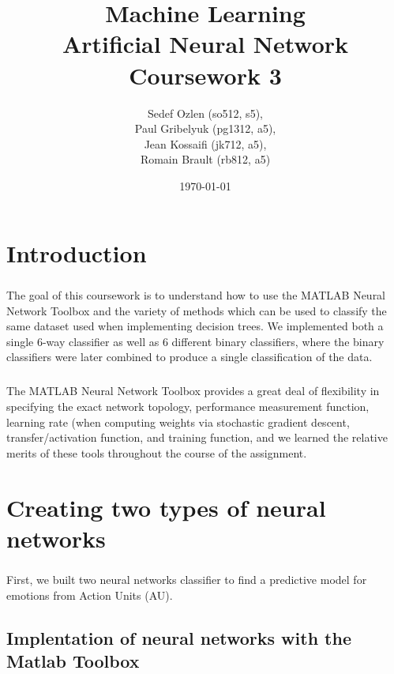 \documentclass[a4paper,12pt,oneside,final]{report}
\author{
    Sedef Ozlen (so512, s5), \\ 
    Paul Gribelyuk (pg1312, a5), \\
    Jean Kossaifi (jk712, a5), \\ 
    Romain Brault (rb812, a5)
}
\title{\Huge Machine Learning \\ Artificial Neural Network \\ Coursework 3}
\date{\today}
\begin{document}
\maketitle
\tableofcontents
\listoffigures

\chapter{Introduction}
\paragraph{}
The goal of this coursework is to understand how to use the MATLAB Neural Network Toolbox and the variety of methods which can be used to classify the same dataset used when implementing decision trees.  We implemented both a single 6-way classifier as well as 6 different binary classifiers, where the binary classifiers were later combined to produce a single classification of the data.
\paragraph{}
The MATLAB Neural Network Toolbox provides a great deal of flexibility in specifying the exact network topology, performance measurement function, learning rate (when computing weights via stochastic gradient descent, transfer/activation function, and training function, and we learned the relative merits of these tools throughout the course of the assignment.

\chapter{Creating two types of neural networks}
\paragraph{}
First, we built two neural networks classifier to find a predictive model for emotions from Action Units (AU).
\section{Implentation of neural networks with the Matlab Toolbox}
\end{document}
